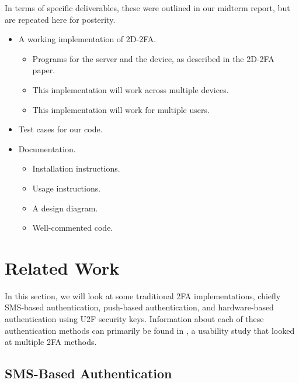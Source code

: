 \documentclass[11pt]{article}
\begin{document}
In terms of specific deliverables, these were outlined in our midterm
report, but are repeated here for posterity.
\begin{itemize}
    \item A working implementation of 2D-2FA.

    \begin{itemize}
        \item Programs for the server and the device, as described in
        the 2D-2FA paper. 

        \item This implementation will work across multiple devices.

        \item This implementation will work for multiple users.
    \end{itemize}

    \item Test cases for our code.

    \item Documentation.

    \begin{itemize}
        \item Installation instructions.

        \item Usage instructions.

        \item A design diagram.

        \item Well-commented code.
    \end{itemize}
\end{itemize}


\section{Related Work}

In this section, we will look at some traditional 2FA implementations,
chiefly SMS-based authentication, push-based authentication, and
hardware-based authentication using U2F security keys. Information about
each of these authentication methods can primarily be found in
\cite{UsabilityStudy}, a usability study that looked at multiple 2FA
methods. 


\subsection{SMS-Based Authentication}
\end{document}
